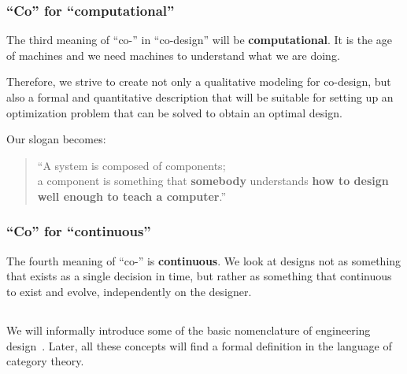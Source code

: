 \subsubsection{``Co'' for ``computational''}

The third meaning of ``co-'' in ``co-design'' will be \textbf{computational}. It is the age of machines and we need
 machines to understand what we are doing.

Therefore, we strive to create not only a qualitative modeling for co-design, but also a formal and quantitative description that will be suitable for setting up an optimization problem that can be solved to obtain an optimal design.

Our slogan becomes:

\begin{quote}
    \enquote{A system is composed of components;\\
      a component is something that \textbf{somebody} understands
      \textbf{how to design} \textbf{well enough to teach a computer}.}
\end{quote}


\subsubsection{``Co'' for ``continuous''}

The fourth meaning of ``co-'' is \textbf{continuous}. We look at designs not as something that exists
as a single decision in time, but rather as something that continuous to exist and evolve, independently
on the designer.






\subsection{}

We will informally introduce some of the basic nomenclature of engineering
design~\cite{antonsson2005formal,deweck2011}. Later, all these concepts will find a formal
definition in the language of category theory.

